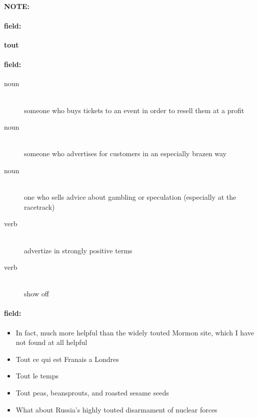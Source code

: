 \documentclass[12pt]{article}
\newenvironment{note}{\paragraph{NOTE:}}{}
\newenvironment{field}{\paragraph{field:}}{}
\begin{document}
\begin{note}
\begin{field}
\textbf{\large tout}
\end{field}


\begin{field}
\begin{description}
\item[noun] \hfill \\ 
someone who buys tickets to an event in order to resell them at a profit

\item[noun] \hfill \\ 
someone who advertises for customers in an especially brazen way

\item[noun] \hfill \\ 
one who sells advice about gambling or speculation (especially at the racetrack)

\item[verb] \hfill \\ 
advertize in strongly positive terms

\item[verb] \hfill \\ 
show off

\end{description}
\end{field}

\begin{field}
\begin{itemize}
\item In fact, much more helpful than the widely touted Mormon site, which I have not found at all helpful
\item Tout ce qui est Franais a Londres
\item Tout le temps
\item Tout peas, beansprouts, and roasted sesame seeds
\item What about Russia's highly touted disarmament of nuclear forces
\end{itemize}
\end{field}
\end{note}
\end{document}
